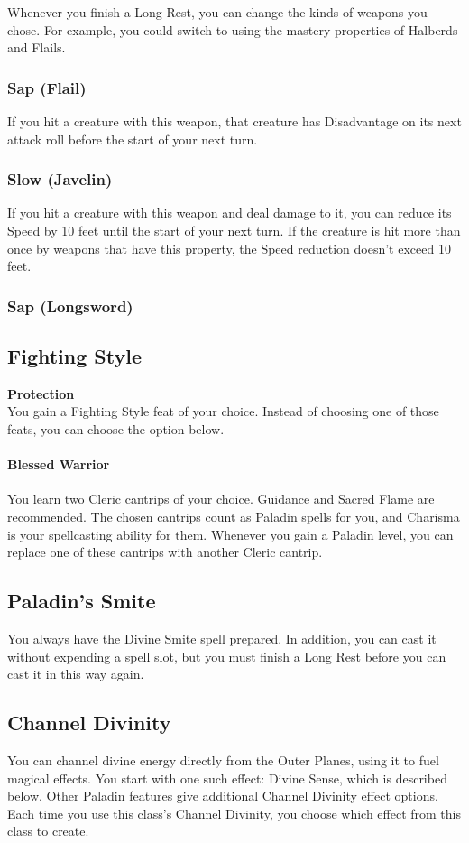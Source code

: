 \documentclass[letterpaper,openany,oneside,twocolumn]{book}
\begin{document}
Whenever you finish a Long Rest, you can change the kinds of weapons you chose. For example, you could switch to using the mastery properties of Halberds and Flails.
\subsubsection*{Sap (Flail)}
If you hit a creature with this weapon, that creature has Disadvantage on its next attack roll before the start of your next turn.
\subsubsection*{Slow (Javelin)}
If you hit a creature with this weapon and deal damage to it, you can reduce its Speed by 10 feet until the start of your next turn. If the creature is hit more than once by weapons that have this property, the Speed reduction doesn't exceed 10 feet.
\subsubsection*{Sap (Longsword)}
\subsection*{Fighting Style}
\textbf{Protection}\\
You gain a Fighting Style feat of your choice. Instead of choosing one of those feats, you can choose the option below.

\paragraph*{Blessed Warrior} You learn two Cleric cantrips of your choice. Guidance and Sacred Flame are recommended. The chosen cantrips count as Paladin spells for you, and Charisma is your spellcasting ability for them. Whenever you gain a Paladin level, you can replace one of these cantrips with another Cleric cantrip.
\subsection*{Paladin's Smite}
You always have the Divine Smite spell prepared. In addition, you can cast it without expending a spell slot, but you must finish a Long Rest before you can cast it in this way again.
\subsection*{Channel Divinity}
You can channel divine energy directly from the Outer Planes, using it to fuel magical effects. You start with one such effect: Divine Sense, which is described below. Other Paladin features give additional Channel Divinity effect options. Each time you use this class's Channel Divinity, you choose which effect from this class to create.
\end{document}
